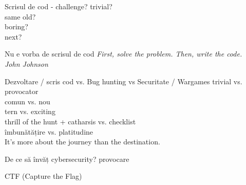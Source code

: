 \documentclass{simple}
\begin{document}
\begin{frame}{Scrisul de cod - challenge?}
  \centering
  \pause
  \vspace{0.5cm}
  \Large{trivial?} \\
  \pause
  \vspace{0.5cm}
  \Large{same old?} \\
  \pause
  \vspace{0.5cm}
  \Large{boring?} \\
  \pause
  \vspace{0.5cm}
  \Large{next?}
\end{frame}

\begin{frame}{Nu e vorba de scrisul de cod}
  \centering
  \pause
  \textit{First, solve the problem. Then, write the code.} \\
  \vspace{3mm}
  \hfill \textit{John Johnson} \\
\end{frame}

\begin{frame}{Dezvoltare / scris cod vs. Bug hunting vs Securitate / Wargames}
  \centering
  \pause
  \vspace{0.5cm}
  \Large{trivial vs. provocator} \\
  \pause
  \vspace{0.5cm}
  \Large{comun vs. nou} \\
  \pause
  \vspace{0.5cm}
  \Large{tern vs. exciting} \\
  \pause
  \vspace{0.5cm}
  \Large{thrill of the hunt + catharsis vs. checklist} \\
  \pause
  \vspace{0.5cm}
  \Large{îmbunătățire vs. platitudine} \\
  \pause
  \vspace{0.5cm}
  \Large{It's more about the journey than the destination.}
\end{frame}

\begin{frame}{De ce să învăț cybersecurity?}
  \centering
  \pause
  \vspace{0.5cm}
  \Large{provocare} \\
\end{frame}

\begin{frame}{}
  \centering
  \LARGE
  CTF (Capture the Flag)
\end{frame}
\end{document}
